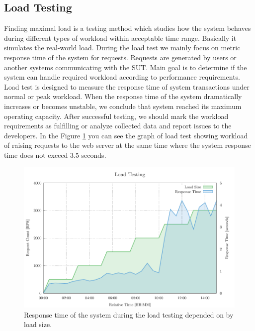 \subsection*{Load Testing}
Finding maximal load is a testing method which studies how the system behaves during different types of workload within acceptable time range. Basically it simulates the real-world load. During the load test we mainly focus on metric response time of the system for requests. Requests are generated by users or another systems communicating with the SUT. Main goal is to determine if the system can handle required workload according to performance requirements. Load test is designed to measure the response time of system transactions under normal or peak workload. When the response time of the system dramatically increases or becomes unstable, we conclude that system reached its maximum operating capacity. After successful testing, we should mark the workload requirements as fulfilling or analyze collected data and report issues to the developers. In the Figure \ref{fig:load_test} you can see the graph of load test showing workload of raising requests to the web server at the same time where the system response time does not exceed 3.5 seconds.

\begin{figure}[H]
  \centering
  \includegraphics[width=15cm]{obrazky-figures/load_testing.pdf}
  \caption{Response time of the system during the load testing depended on by load size.}
  \label{fig:load_test}
\end{figure}

